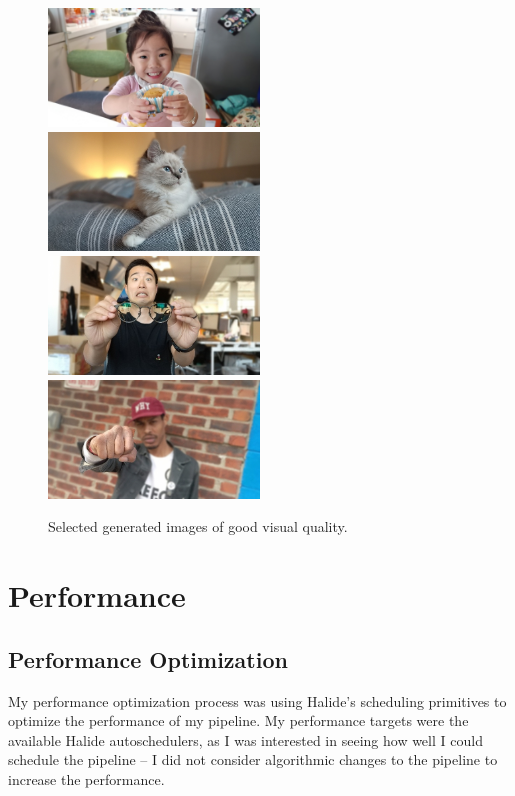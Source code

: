 \documentclass{article}
\begin{document}
\begin{figure}
        \includegraphics[width=0.5\textwidth]{../output/baby-portrait}
        \includegraphics[width=0.5\textwidth]{../output/cat-portrait}
        \includegraphics[width=0.5\textwidth]{../output/glasses-portrait}
        \includegraphics[width=0.5\textwidth]{../output/punch-portrait}
        \caption{Selected generated images of good visual quality.}
        \label{fig:good}
\end{figure}

\section{Performance}

\subsection{Performance Optimization}

My performance optimization process was using Halide's scheduling primitives to optimize the performance of my pipeline.
%
My performance targets were the available Halide autoschedulers, as I was interested in seeing how well I could schedule the pipeline -- I did not
consider algorithmic changes to the pipeline to increase the performance.
\end{document}
